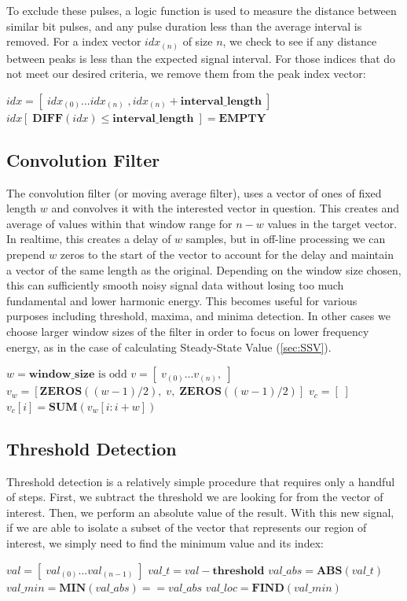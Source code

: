 \documentclass[conference]{IEEEtran}
\begin{document}
To exclude these pulses, a logic function is used to measure the distance between similar bit pulses, and any pulse duration less than the average interval is removed. For a index vector $idx_{(n)}$ of size $n$, we check to see if any distance between peaks is less than the expected signal interval. For those indices that do not meet our desired criteria, we remove them from the peak index vector:
\medbreak
\begin{algorithmic}
\STATE $idx = [\;idx_{(0)} ... idx_{(n)}\;, idx_{(n)} + \textbf{interval\_length}\;]$
\medbreak
\STATE $idx[\;\textbf{DIFF}(idx) \leq \textbf{interval\_length}\;] = \textbf{EMPTY}$
\end{algorithmic}

\subsection{Convolution Filter}
The convolution filter (or moving average filter), uses a vector of ones of fixed length $w$ and convolves it with the interested vector in question. This creates and average of values within that window range for $n-w$ values in the target vector. In realtime, this creates a delay of $w$ samples, but in off-line processing we can prepend $w$ zeros to the start of the vector to account for the delay and maintain a vector of the same length as the original.
Depending on the window size chosen, this can sufficiently smooth noisy signal data without losing too much fundamental and lower harmonic energy. This becomes useful for various purposes including threshold, maxima, and minima detection. In other cases we choose larger window sizes of the filter in order to focus on lower frequency energy, as in the case of calculating Steady-State Value (\ref{sec:SSV}).
\medbreak
\begin{algorithmic}
\STATE $w = \textbf{window\_size} \text{ is odd}$
\STATE $v = [\;v_{(0)} ... v_{(n)},\;]$
\STATE $v_w = [ \textbf{ZEROS}((w-1)/2), \;v,\; \textbf{ZEROS}((w-1)/2)]$
\STATE $v_c = [\;]$
    \STATE $v_c[i] = \textbf{SUM}(v_w[i:i+w])$
\ENDFOR
\end{algorithmic}

\subsection{Threshold Detection} \label{sec:Threshold}
Threshold detection is a relatively simple procedure that requires only a handful of steps. First, we subtract the threshold we are looking for from the vector of interest. Then, we perform an absolute value of the result. With this new signal, if we are able to isolate a subset of the vector that represents our region of  interest, we simply need to find the minimum value and its index:
\medbreak
\begin{algorithmic}
\STATE $val = [\;val_{(0)} ... val_{(n-1)}\;]$
\STATE $val\_t = val - \textbf{threshold}$
\STATE $val\_abs = \textbf{ABS}(val\_t)$
\STATE $val\_min = \textbf{MIN}(val\_abs) == val\_abs$
\STATE $val\_loc = \textbf{FIND}( val\_min ) $
\end{algorithmic}
\end{document}
